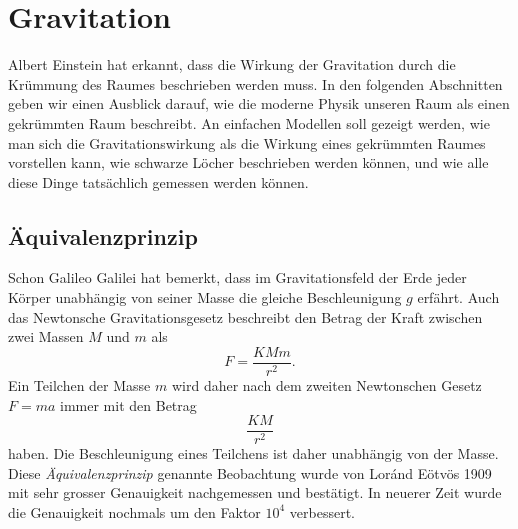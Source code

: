 %
%
%
\chapter{Gravitation%
\label{skript:chapter:gravitation}}
\rhead{}
Albert Einstein hat erkannt, dass die Wirkung der Gravitation 
durch die Krümmung des Raumes beschrieben werden muss.
In den folgenden Abschnitten geben wir einen Ausblick darauf, wie
die moderne Physik unseren Raum als einen gekrümmten Raum beschreibt.
An einfachen Modellen soll gezeigt werden, wie man sich die Gravitationswirkung
als die Wirkung eines gekrümmten Raumes vorstellen kann, wie schwarze Löcher
beschrieben werden können, und wie alle diese Dinge tatsächlich gemessen
werden können.

\section{Äquivalenzprinzip}
Schon Galileo Galilei hat bemerkt, dass im Gravitationsfeld der Erde
jeder Körper unabhängig von seiner Masse die gleiche Beschleunigung $g$
erfährt.
Auch das Newtonsche Gravitationsgesetz beschreibt den Betrag der Kraft
zwischen zwei Massen $M$ und $m$ als
\[
F=\frac{KMm}{r^2}.
\]
Ein Teilchen der Masse $m$ wird daher nach dem zweiten Newtonschen Gesetz
$F=ma$ immer mit den Betrag
\[
\frac{KM}{r^2}
\]
haben.
Die Beschleunigung eines Teilchens ist daher unabhängig von der Masse.
Diese {\em Äquivalenz\-prinzip} genannte Beobachtung wurde von
Lor\'and Eötvös 1909 mit sehr grosser Genauigkeit nachgemessen und bestätigt.
In neuerer Zeit wurde die Genauigkeit nochmals um den Faktor $10^4$
verbessert.

